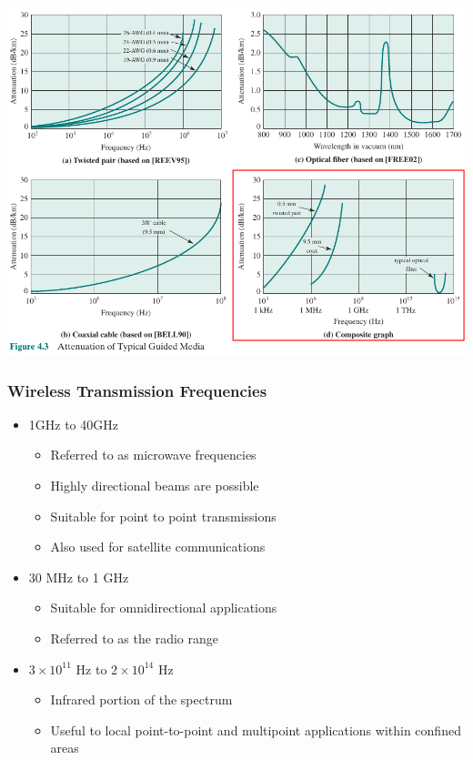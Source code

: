 \documentclass[pdflatex,compress]{beamer}
\begin{document}
\begin{frame}
	\begin{center}
		\includegraphics[height=0.9\textheight]{img/img17}
	\end{center}
\end{frame}

\begin{frame}
	\frametitle{Wireless Transmission Frequencies}
	\begin{itemize}
		\item 1GHz to 40GHz
		\begin{itemize}
			\item Referred to as microwave frequencies
			\item Highly directional beams are possible
			\item Suitable for point to point transmissions
			\item Also used for satellite communications
		\end{itemize}
		\item 30 MHz to 1 GHz
		\begin{itemize}
			\item Suitable for omnidirectional applications
			\item Referred to as the radio range
		\end{itemize}
		\item $ 3 \times 10^{11} $ Hz to $ 2 \times 10^{14} $ Hz
		\begin{itemize}
			\item Infrared portion of the spectrum
			\item Useful to local point-to-point and multipoint applications within confined areas
		\end{itemize}
	\end{itemize}
\end{frame}
\end{document}
